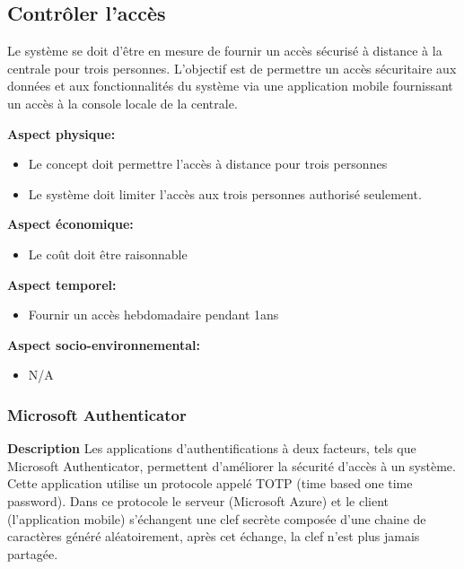 
\subsection{Contrôler l'accès}
\label{ContrôlerLAccès}
Le système se doit d’être en mesure de fournir un accès sécurisé à distance à la centrale pour trois personnes. L’objectif est de permettre un accès sécuritaire aux données et aux fonctionnalités du système via une application mobile fournissant un accès à la console locale de la centrale.\bigskip

\noindent\textbf{Aspect physique:}
\begin{itemize}
    \item Le concept doit permettre l’accès à distance pour trois personnes
    \item Le système doit limiter l'accès aux trois personnes authorisé seulement.
\end{itemize}

\noindent\textbf{Aspect économique:}
\begin{itemize}
    \item Le coût doit être raisonnable
\end{itemize}

\noindent\textbf{Aspect temporel:}
\begin{itemize}
    \item Fournir un accès hebdomadaire pendant 1ans
\end{itemize}

\noindent\textbf{Aspect socio-environnemental:}
\begin{itemize}
    \item N/A
\end{itemize}


\subsubsection{Microsoft Authenticator}
\label{sec:micro}
\noindent\textbf{Description} Les applications d’authentifications à deux facteurs, tels que Microsoft Authenticator, permettent d’améliorer la sécurité d’accès à un système. Cette application utilise un protocole appelé TOTP (time based one time password). Dans ce protocole le serveur (Microsoft Azure) et le client (l’application mobile) s’échangent une clef secrète composée d’une chaine de caractères généré aléatoirement, après cet échange, la clef n’est plus jamais partagée. 
\\

